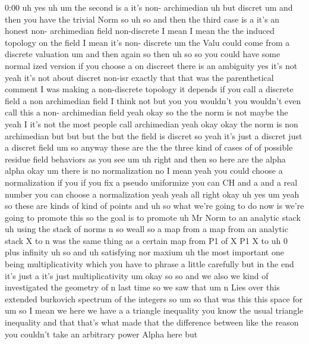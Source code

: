 \begin{unfinished}{0:00}
uh
yes
uh  um  the  second  is  a  it's  non-
archimedian
uh  but
discret  um  and  then  you  have  the  trivial
Norm
so
uh
so  and  then  the  third  case  is  a  it's  an
honest  non-  archimedian
field  non-discrete  I  mean  I  mean  the  the
induced  topology  on  the  field  I  mean
it's  non-  discrete  um  the  Valu  could
come  from  a  discrete
valuation  um  and  then  again  so  then  uh
so  so  you  could  have  some  normal  ized
version  if  you  choose  a  on  discreet
there  is  an  ambiguity  yes  it's  not  yeah
it's  not  about  discret  non-isr  exactly
that  that  was  the  parenthetical  comment
I  was  making  a  non-discrete  topology  it
depends  if  you  call  a  discrete  field  a
non  archimedian  field  I  think  not  but
you  you  wouldn't  you  wouldn't  even  call
this  a  non-  archimedian  field  yeah  okay
so  the  the  norm  is  not  maybe  the
yeah  I  it's  not  the  most  people  call
archimedian  yeah  okay  okay  the  norm  is
non  archimedian
but  but  but  the  but  the  field  is  discret
so  yeah  it's  just  a  discret  just  a
discret  field  um  so  anyway  these  are  the
the  three  kind  of  cases  of  of  possible
residue  field  behaviors  as  you
see
um  uh  right  and  then  so  here  are  the
alpha
alpha
okay  um  there  is  no  normalization  no  I
mean  yeah  you  could  choose  a
normalization  if  you  if  you  fix  a  pseudo
uniformize  you  can  CH  and  a  and  a  real
number  you  can  choose  a
normalization
yeah
yeah  all  right
okay  uh
yes
um  yeah  so  these  are  kinds  of  kind  of
points  and
uh  so  what  we're  going  to  do  now  is
we're  going  to  promote  this  so  the  goal
is
to
promote  uh  Mr  Norm  to  an  analytic
stack  uh  using  the  stack  of
norms  n  so  weall
so  a  map
from  a  map  from  an  analytic  stack  X  to  n
was  the  same  thing  as  a  certain  map  from
P1  of  X  P1  X  to  uh  0  plus
infinity  uh  so  and  uh  satisfying  nor
maxium  uh  the  most  important  one  being
multiplicativity
which  you  have  to  phrase  a  little
carefully  but  in  the  end  it's  just  a
it's  just
multiplicativity
um  okay
so  so  and  we  also  we  kind  of
investigated  the  geometry  of  n  last  time
so  we  saw  that  um  n  Lies  over  this
extended  burkovich  spectrum  of  the
integers
so  um  so  that  was  this  this  space  for  um
so  I  mean  we  here  we  have  a  a  triangle
inequality  you  know  the  usual  triangle
inequality  and  that  that's  what  made
that  the  difference  between  like  the
reason  you  couldn't  take  an  arbitrary
power  Alpha  here  but

\end{unfinished}
